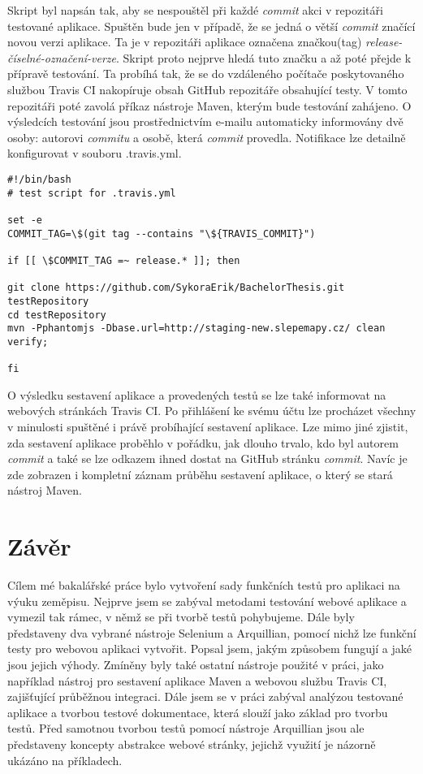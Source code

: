 \documentclass[
    color,   %
	table,   %
    twoside, %
    nolot, nolof
]{fithesis3}
\begin{document}
Skript byl napsán tak, aby se nespouštěl při každé \emph{commit} akci v repozitáři testované aplikace. Spuštěn bude jen v případě, že se jedná o větší \emph{commit} značící novou verzi aplikace. Ta je v repozitáři aplikace označena značkou(tag) \emph{release-číselné-označení-verze}. Skript proto nejprve hledá tuto značku a až poté přejde k přípravě testování. Ta probíhá tak, že se do vzdáleného počítače poskytovaného službou Travis CI nakopíruje obsah GitHub repozitáře obsahující testy. V tomto repozitáři poté zavolá příkaz nástroje Maven, kterým bude testování zahájeno. O výsledcích testování jsou prostřednictvím e-mailu automaticky informovány dvě osoby: autorovi \emph{commitu} a osobě, která  \emph{commit} provedla. Notifikace lze detailně konfigurovat v souboru .travis.yml.

\begin{lstlisting}
#!/bin/bash
# test script for .travis.yml
 
set -e
COMMIT_TAG=\$(git tag --contains "\${TRAVIS_COMMIT}")

if [[ \$COMMIT_TAG =~ release.* ]]; then 

git clone https://github.com/SykoraErik/BachelorThesis.git testRepository
cd testRepository
mvn -Pphantomjs -Dbase.url=http://staging-new.slepemapy.cz/ clean verify;

fi
\end{lstlisting} 

O výsledku sestavení aplikace a provedených testů se lze také informovat na webových stránkách Travis CI. Po přihlášení ke svému účtu lze procházet všechny v minulosti spuštěné i právě probíhající sestavení aplikace. Lze mimo jiné zjistit, zda sestavení aplikace proběhlo v pořádku, jak dlouho trvalo, kdo byl autorem \emph{commit} a také se lze odkazem ihned dostat na GitHub stránku \emph{commit}. Navíc je zde zobrazen i kompletní záznam průběhu sestavení aplikace, o který se stará nástroj Maven.

\chapter{Závěr}
\label{ch:chapter7}
Cílem mé bakalářské práce bylo vytvoření sady funkčních testů pro aplikaci na výuku zeměpisu. Nejprve jsem se zabýval metodami testování webové aplikace a vymezil tak rámec, v němž se při tvorbě testů pohybujeme. Dále byly představeny dva vybrané nástroje Selenium a Arquillian, pomocí nichž lze funkční testy pro webovou aplikaci vytvořit. Popsal jsem, jakým způsobem fungují a jaké jsou jejich výhody. Zmíněny byly také ostatní nástroje použité v práci, jako například nástroj pro sestavení aplikace Maven a webovou službu Travis CI, zajišťující průběžnou integraci. Dále jsem se v práci zabýval analýzou testované aplikace a tvorbou testové dokumentace, která slouží jako základ pro tvorbu testů. Před samotnou tvorbou testů pomocí nástroje Arquillian jsou ale představeny koncepty abstrakce webové stránky, jejichž využití je názorně ukázáno na příkladech.
\end{document}

